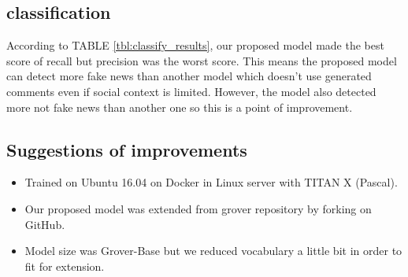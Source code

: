 \documentclass[conference]{IEEEtran}
\begin{document}
\subsection{classification}
According to TABLE \ref{tbl:classify_results}, our proposed model made the best score of recall but precision was the worst score.
This means the proposed model can detect more fake news than another model which doesn't use generated comments even if social context is limited. 
However, the model also detected more not fake news than another one so this is a point of improvement.


\subsection{Suggestions of improvements}
\label{app:settings}
\begin{itemize}[]
    \item Trained on Ubuntu 16.04 on Docker in Linux server with TITAN X (Pascal).
    \item Our proposed model was extended from grover repository by forking on GitHub.
    \item Model size was Grover-Base but we reduced vocabulary a little bit in order to fit for extension.
\end{itemize}


\end{document}
